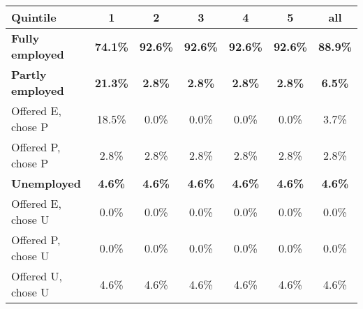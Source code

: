 \begin{center}
\begin{adjustbox}{width=\textwidth}
\begin{tabular}{lcccccc}\toprule
Quintile & 1 & 2 & 3 & 4 & 5 & all \\
\midrule
\textbf{Fully employed} & \textbf{74.1\%} & \textbf{92.6\%} & \textbf{92.6\%} & \textbf{92.6\%} & \textbf{92.6\%} & \textbf{88.9\%} \\
\textbf{Partly employed} & \textbf{21.3\%} & \textbf{2.8\%} & \textbf{2.8\%} & \textbf{2.8\%} & \textbf{2.8\%} & \textbf{6.5\%} \\
\;\;Offered E, chose P & 18.5\% & 0.0\% & 0.0\% & 0.0\% & 0.0\% & 3.7\% \\
\;\;Offered P, chose P & 2.8\% & 2.8\% & 2.8\% & 2.8\% & 2.8\% & 2.8\% \\
\textbf{Unemployed} & \textbf{4.6\%} & \textbf{4.6\%} & \textbf{4.6\%} & \textbf{4.6\%} & \textbf{4.6\%} & \textbf{4.6\%} \\
\;\;Offered E, chose U & 0.0\% & 0.0\% & 0.0\% & 0.0\% & 0.0\% & 0.0\% \\
\;\;Offered P, chose U & 0.0\% & 0.0\% & 0.0\% & 0.0\% & 0.0\% & 0.0\% \\
\;\;Offered U, chose U & 4.6\% & 4.6\% & 4.6\% & 4.6\% & 4.6\% & 4.6\% \\
\bottomrule\end{tabular}
\end{adjustbox}
\end{center}